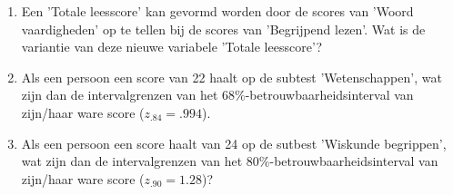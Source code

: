 {\begin{enumerate}
\begin{enumerate}
\item Een 'Totale leesscore' kan gevormd worden door de scores van 'Woord vaardigheden' op te tellen bij de scores van 'Begrijpend lezen'. Wat is de variantie van deze nieuwe variabele 'Totale leesscore'?



\item Als een persoon een score van 22 haalt op de subtest 'Wetenschappen', wat zijn dan de intervalgrenzen van het $68\%$-betrouwbaarheidsinterval van zijn/haar ware score ($z_{.84} = .994$).

\item Als een persoon een score haalt van 24 op de sutbest 'Wiskunde begrippen', wat zijn dan de intervalgrenzen van het $80\%$-betrouwbaarheidsinterval van zijn/haar ware score ($z_{.90}=1.28$)? 

\end{enumerate}
\end{enumerate}
}

